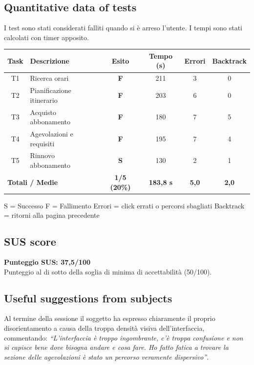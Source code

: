 \documentclass[11pt,a4paper]{article}
\begin{document}
\subsection*{Quantitative data of tests}
\begin{tcolorbox}[colback=backgroundColor,colframe=borderColor,arc=2mm]
I test sono stati considerati falliti quando si è arreso l'utente.
I tempi sono stati calcolati con timer apposito.
\begin{center}
\renewcommand{\arraystretch}{1.4}
\begin{tabular}{clcccc}
\toprule
\textbf{Task} & \textbf{Descrizione} &
\textbf{Esito} & \textbf{Tempo (s)} &
\textbf{Errori} & \textbf{Backtrack} \\
\midrule
T1 & Ricerca orari             & \textbf{F} & 211 & 3 & 0 \\
T2 & Pianificazione itinerario & \textbf{F} & 203 & 6 & 0 \\
T3 & Acquisto abbonamento      & \textbf{F} & 180 & 7 & 5 \\
T4 & Agevolazioni e requisiti  & \textbf{F} & 195 & 7 & 4 \\
T5 & Rinnovo abbonamento       & \textbf{S} & 130 & 2 & 1 \\
\midrule
\multicolumn{2}{l}{\textbf{Totali / Medie}} &
\textbf{1/5 (20\%)} & \textbf{183,8 s} &
\textbf{5,0} & \textbf{2,0} \\
\bottomrule
\end{tabular}
\end{center}

\vspace{0.3cm}
\small S = Successo \quad F = Fallimento \quad
Errori = click errati o percorsi sbagliati \quad
Backtrack = ritorni alla pagina precedente
\end{tcolorbox}

\subsection*{SUS score}
\begin{tcolorbox}[colback=backgroundColor,colframe=borderColor,arc=2mm]
\textbf{Punteggio SUS: 37,5/100}\\[0.2cm]
\small Punteggio al di sotto della soglia di minima di accettabilità
(50/100).
\end{tcolorbox}

\subsection*{Useful suggestions from subjects}
\begin{tcolorbox}[colback=backgroundColor,colframe=borderColor,arc=2mm]
Al termine della sessione il soggetto ha espresso chiaramente il proprio disorientamento a causa della troppa densità visiva dell'interfaccia, commentando:
\textit{``L'interfaccia è troppo ingombrante, c'è troppa confusione e non si capisce bene dove bisogna andare e cosa fare. Ho fatto fatica a trovare la sezione delle agevolazioni è stato un percorso veramente dispersivo''}.
\end{tcolorbox}
\end{document}
